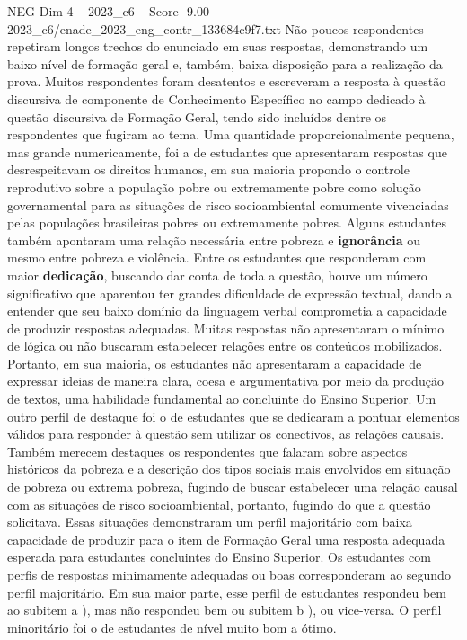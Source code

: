 \begin{textsample}{NEG Dim 4 – 2023\_c6 – Score -9.00 – 2023\_c6/enade\_2023\_eng\_contr\_133684c9f7.txt}
Não poucos respondentes repetiram longos trechos do enunciado em suas respostas, demonstrando um baixo nível de formação geral e, também, baixa disposição para a realização da prova.
Muitos respondentes foram desatentos e escreveram a resposta à questão discursiva de componente de Conhecimento Específico no campo dedicado à questão discursiva de Formação Geral, tendo sido incluídos dentre os respondentes que fugiram ao tema.
Uma quantidade proporcionalmente pequena, mas grande numericamente, foi a de estudantes que apresentaram respostas que desrespeitavam os direitos humanos, em sua maioria propondo o controle reprodutivo sobre a população pobre ou extremamente pobre como solução governamental para as situações de risco socioambiental comumente vivenciadas pelas populações brasileiras pobres ou extremamente pobres.
Alguns estudantes também apontaram uma relação necessária entre pobreza e \textbf{ignorância} ou mesmo entre pobreza e violência.
Entre os estudantes que responderam com maior \textbf{dedicação}, buscando dar conta de toda a questão, houve um número significativo que aparentou ter grandes dificuldade de expressão textual, dando a entender que seu baixo domínio da linguagem verbal comprometia a capacidade de produzir respostas adequadas.
Muitas respostas não apresentaram o mínimo de lógica ou não buscaram estabelecer relações entre os conteúdos mobilizados.
Portanto, em sua maioria, os estudantes não apresentaram a capacidade de expressar ideias de maneira clara, coesa e argumentativa por meio da produção de textos, uma habilidade fundamental ao concluinte do Ensino Superior.
Um outro perfil de destaque foi o de estudantes que se dedicaram a pontuar elementos válidos para responder à questão sem utilizar os conectivos, as relações causais.
Também merecem destaques os respondentes que falaram sobre aspectos históricos da pobreza e a descrição dos tipos sociais mais envolvidos em situação de pobreza ou extrema pobreza, fugindo de buscar estabelecer uma relação causal com as situações de risco socioambiental, portanto, fugindo do que a questão solicitava.
Essas situações demonstraram um perfil majoritário com baixa capacidade de produzir para o item de Formação Geral uma resposta adequada esperada para estudantes concluintes do Ensino Superior.
Os estudantes com perfis de respostas minimamente adequadas ou boas corresponderam ao segundo perfil majoritário.
Em sua maior parte, esse perfil de estudantes respondeu bem ao subitem a ), mas não respondeu bem ou subitem b ), ou vice-versa.
O perfil minoritário foi o de estudantes de nível muito bom a ótimo.

\end{textsample}
